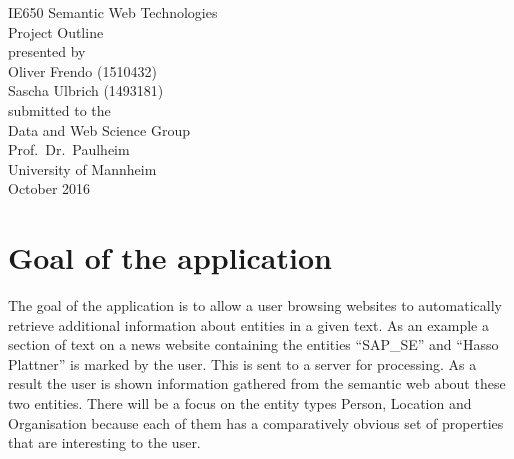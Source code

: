\documentclass[11pt,titlepage,oneside,openany]{article}
\begin{document}
\begin{titlepage}
	\vspace*{2cm}
  \begin{center}
   {\Large IE650 Semantic Web Technologies\\}
   \vspace{2cm} 
   {Project Outline\\}
   \vspace{2cm}
   {presented by\\
    Oliver Frendo (1510432) \\
    Sascha Ulbrich (1493181) \\
   }
   \vspace{1cm} 
   {submitted to the\\
    Data and Web Science Group\\
    Prof.\ Dr.\ Paulheim\\
    University of Mannheim\\} \vspace{2cm}
   {October 2016}
  \end{center}
\end{titlepage} 






\newpage



\section{Goal of the application}
The goal of the application is to allow a user browsing websites to
automatically retrieve additional information about entities in a given text. 
As an example a section of text on a news website containing the entities
``SAP\_SE'' and ``Hasso Plattner'' is marked by the user. This is sent to
a server for processing. As a result the user is shown information gathered from
the semantic web about these two entities. There will be a focus on the entity
types Person, Location and Organisation because each of them has
a comparatively obvious set of properties that are interesting to the user.
\end{document}
